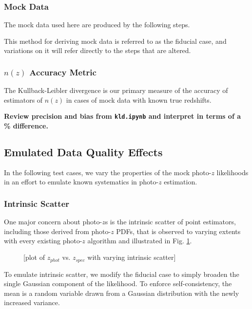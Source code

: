\documentclass[iop]{emulateapj}
\begin{document}
\subsubsection{Mock Data}
\label{sec:mockdata}

The mock data used here are produced by the following steps.  

This method for deriving mock data is referred to as the fiducial case, and variations on it will refer directly to the steps that are altered.

\subsubsection{$n(z)$ Accuracy Metric}
\label{sec:accuracy}

The Kullback-Leibler divergence is our primary measure of the accuracy of estimators of $n(z)$ in cases of mock data with known true redshifts.

\textbf{Review precision and bias from \texttt{kld.ipynb} and interpret in terms of a \% difference.}

\subsection{Emulated Data Quality Effects}
\label{sec:likelihoods}

In the following test cases, we vary the properties of the mock photo-$z$ likelihoods in an effort to emulate known systematics in photo-$z$ estimation.

\subsubsection{Intrinsic Scatter}
\label{sec:intscat}

One major concern about photo-$z$s is the intrinsic scatter of point estimators, including those derived from photo-$z$ PDFs, that is observed to varying extents with every existing photo-$z$ algorithm and illustrated in Fig. \ref{fig:intscat}.  

\begin{figure}
	\begin{center}
		\caption{[plot of $z_{phot}$ vs. $z_{spec}$ with varying intrinsic scatter]}
		\label{fig:intscat}
	\end{center}
\end{figure}

To emulate intrinsic scatter, we modify the fiducial case to simply broaden the single Gaussian component of the likelihood.  To enforce self-consistency, the mean is a random variable drawn from a Gaussian distribution with the newly increased variance.
\end{document}
